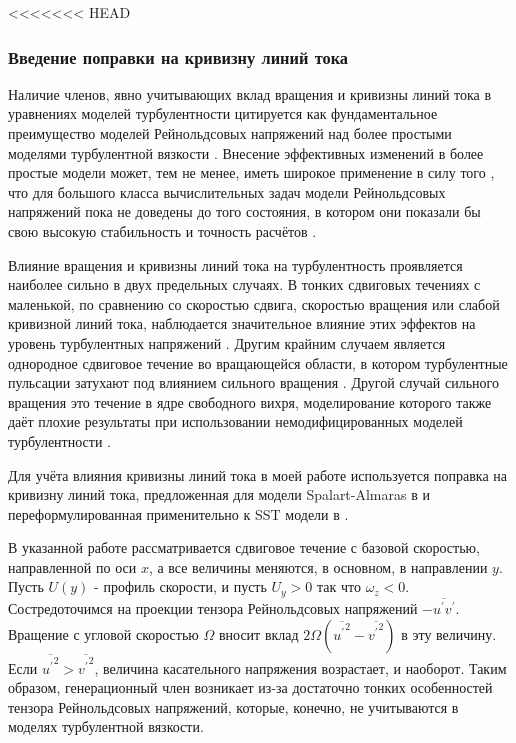 <<<<<<< HEAD
	\subsubsection{Введение поправки на кривизну линий тока}
		\label{CC}
		Наличие членов, явно учитывающих вклад вращения и кривизны линий тока в уравнениях моделей турбулентности цитируется как фундаментальное преимущество моделей Рейнольдсовых напряжений над более простыми моделями турбулентной вязкости \cite{ShurSpallart}. Внесение эффективных изменений в более простые модели может, тем не менее, иметь широкое применение в силу того \cite{CC2}, что для большого класса вычислительных задач модели Рейнольдсовых напряжений пока не доведены до того состояния, в котором они показали бы свою высокую стабильность и точность расчётов \cite{CC3}.
		
		Влияние вращения и кривизны линий тока на турбулентность проявляется наиболее сильно в двух предельных случаях. В тонких сдвиговых течениях с маленькой, по сравнению со скоростью сдвига, скоростью вращения или слабой кривизной линий тока, наблюдается значительное влияние этих эффектов на уровень турбулентных напряжений \cite{Bradshaw}. Другим крайним случаем является однородное сдвиговое течение во вращающейся области, в котором турбулентные пульсации затухают под влиянием сильного вращения \cite{Speziale}. Другой случай сильного вращения это течение в ядре свободного вихря, моделирование которого также даёт плохие результаты при использовании немодифицированных моделей турбулентности \cite{Govindaraju}.
		
		Для учёта влияния кривизны линий тока в моей работе используется поправка на кривизну линий тока, предложенная для модели Spalart-Almaras в \cite{ShurSpallart} и переформулированная применительно к SST модели в \cite{Smirnov}.
		
		В указанной работе рассматривается сдвиговое течение с базовой скоростью, направленной по оси $x$, а все величины меняются, в основном, в направлении $y$. Пусть $U(y)$ - профиль скорости, и пусть $U_y > 0$ так что $\omega_z < 0$. Состредоточимся на проекции тензора Рейнольдсовых напряжений $-\overline{u^{'}v^{'}}$. Вращение с угловой скоростью $\Omega$ вносит вклад $2\Omega(\overline{{u^{'}}^2}-\overline{{v^{'}}^2})$ в эту величину. Если $\overline{{u^{'}}^2} > \overline{{v^{'}}^2}$, величина касательного напряжения возрастает, и наоборот. Таким образом, генерационный член возникает из-за достаточно тонких особенностей тензора Рейнольдсовых напряжений, которые, конечно, не учитываются в моделях турбулентной вязкости.
		
